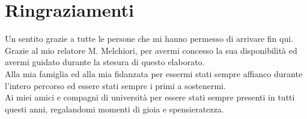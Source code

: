 \chapter*{Ringraziamenti}
Un sentito grazie a tutte le persone che mi hanno permesso di arrivare fin qui.\\
Grazie al mio relatore M. Melchiori, per avermi concesso la sua disponibilità ed
avermi guidato durante la stesura di questo elaborato.\\
Alla mia famiglia ed alla mia fidanzata per essermi stati sempre affianco durante
l'intero percorso ed essere stati sempre i primi a sostenermi.\\
Ai miei amici e compagni di università per essere stati sempre presenti in tutti
questi anni, regalandomi momenti di gioia e spensieratezza.


